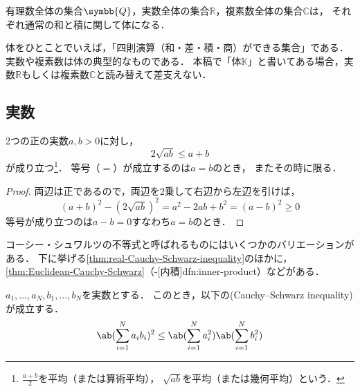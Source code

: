 \documentclass[../sotsu.tex]{subfiles}
\begin{document}
\begin{example}
    有理数全体の集合$\symbb{Q}$，実数全体の集合$ℝ$，複素数全体の集合$ℂ$は，
    それぞれ通常の和と積に関して体になる．
\end{example}

体をひとことでいえば，「四則演算（和・差・積・商）ができる集合」である．
実数や複素数は体の典型的なものである．
本稿で「体$𝕂$」と書いてある場合，実数$ℝ$もしくは複素数$ℂ$と読み替えて差支えない．



\subsection{実数}
\label{sec:real-number-field}



\begin{lemma}[相加相乗平均の関係]
    \label{thm:arithmetic-mean-vs-geometric-mean}
    2つの正の実数$a, b > 0$に対し，
    \begin{equation}
        \label{eq:arithmetic-mean-vs-geometric-mean}
        2 \sqrt{ a b } \leq a + b
    \end{equation}
    が成り立つ\footnote{
        $\displaystyle \frac{a + b}{2}$を平均（または算術平均），
        $\sqrt{ab}$を平均（または幾何平均）という．
    }．
    等号（$=$）が成立するのは$a = b$のとき，
    またその時に限る．
\end{lemma}


\begin{proof}
    両辺は正であるので，両辺を2乗して右辺から左辺を引けば，
    \begin{equation*}
        (a + b)^2 - (2 \sqrt{ a b })^2
            = a^2 - 2 a b + b^2
            = (a - b)^2
            \geq 0
    \end{equation*}
    等号が成り立つのは$a - b = 0$すなわち$a = b$のとき．
\end{proof}


コーシー・シュワルツの不等式と呼ばれるものにはいくつかのバリエーションがある．
下に挙げる\cref{thm:real-Cauchy-Schwarz-inequality}のほかに，
\cref{thm:Euclidean-Cauchy-Schwarz}（-[内積]{dfn:inner-product}）などがある．

\begin{lemma}
    \label{thm:real-Cauchy-Schwarz-inequality}
    $a_1, \dots, a_N, b_1, \dots, b_N$を実数とする．
    このとき，以下の(Cauchy--Schwarz inequality)%
    が成立する．
    \begin{equation}
        \label{eq:real-Cauchy-Schwarz-inequality}
        \ab( \sum_{i = 1}^{N} a_i b_i )^2
        \leq
        \ab( \sum_{i = 1}^{N} a_i^2 )
        \ab( \sum_{i = 1}^{N} b_i^2 )
    \end{equation}
\end{lemma}
\end{document}
